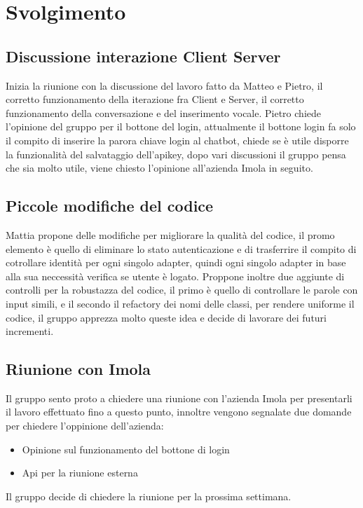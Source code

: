 \section{Svolgimento}
\subsection{Discussione interazione Client Server}
	Inizia la riunione con la discussione del lavoro fatto da Matteo e Pietro, il corretto funzionamento della iterazione fra Client e Server, il corretto funzionamento della conversazione e del inserimento vocale.
	Pietro chiede l'opinione del gruppo per il bottone del login, attualmente il bottone login fa solo il compito di inserire la parora chiave login al chatbot, chiede se è utile disporre la funzionalità del salvataggio dell'apikey, dopo vari discussioni il gruppo pensa che sia molto utile, viene chiesto l'opinione all'azienda Imola in seguito.
	
	\subsection{Piccole modifiche del codice}
	Mattia propone delle modifiche per migliorare la qualità del codice, il promo elemento è quello di eliminare lo stato autenticazione e di trasferrire il compito di cotrollare identità per ogni singolo adapter, quindi ogni singolo adapter in base alla sua neccessità verifica se utente è logato.
	Proppone inoltre due aggiunte di controlli per la robustazza del codice, il primo è quello di controllare le parole con input simili, e il secondo il refactory dei nomi delle classi, per rendere uniforme il codice, il gruppo apprezza molto queste idea e decide di lavorare dei futuri incrementi.
	
	\subsection{Riunione con Imola}
	Il gruppo sento proto a chiedere una riunione con l'azienda Imola per presentarli il lavoro effettuato fino a questo punto, innoltre vengono segnalate due domande per chiedere l'oppinione dell'azienda:
	\begin{itemize}
	\item Opinione sul funzionamento del bottone di login
	\item Api per la riunione esterna
	\end{itemize}
	Il gruppo decide di chiedere la riunione per la prossima settimana.


